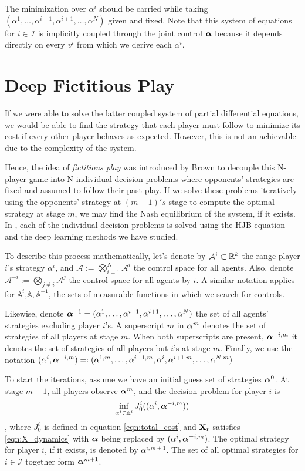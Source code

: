 The minimization over $\alpha^i$ should be carried while taking $(\alpha^1,\ldots,\alpha^{i-1},\alpha^{i+1},\ldots,\alpha^N)$ given and fixed. Note that this system of equations for $i\in\mathcal{I}$ is implicitly coupled through the joint control $\bm{\alpha}$ because it depends directly on every $v^i$ from which we derive each $\alpha^i$.

\section{Deep Fictitious Play}
If we were able to solve the latter coupled system of partial differential equations, we would be able to find the strategy that each player must follow to minimize its cost if every other player behaves as expected.  However, this is not an achievable due to the complexity of the system.

Hence, the idea of \textit{fictitious play} was introduced by Brown \cite{brown_notes_1949} to decouple this N-player game into N individual decision problems where opponents' strategies are fixed and assumed to follow their past play. If we solve these problems iteratively using the opponents' strategy  at $(m-1)'s$ stage to compute the optimal strategy at stage $m$, we may find the Nash equilibrium of the system, if it exists. In \cite{han_deep_2020}, each of the individual decision problems is solved using the HJB equation and the deep learning methods we have studied.  

To describe this process mathematically, let's denote by $\mathcal{A}^i\subset \mathbb{R}^k $ the range player $i$'s strategy $\alpha^i$, and $\mathcal{A}:=\bigotimes_{i=1}^{N}\mathcal{A}^i$ the control space for all agents. Also, denote $\mathcal{A}^{-i}:=\bigotimes_{j\neq i}\mathcal{A}^j$ the control space for all agents by $i$. A similar notation applies for $\mathbb{A}^i$,$\mathbb{A},\mathbb{A}^{-1}$, the sets of measurable functions in which we search for controls.

Likewise, denote $\bm{\alpha}^{-1}=(\alpha^1,\ldots,\alpha^{i-1},\alpha^{i+1},\ldots,\alpha^{N})$ the set of all agents' strategies excluding player $i$'s. A superscript $m$ in $\bm{\alpha}^m$ denotes the set of strategies of all players at stage $m$. When both superscripts are present, $\bm{\alpha}^{-i,m}$ it denotes the set of strategies of all players but $i$'s at stage $m$. Finally, we use the notation $(\alpha^i,\bm{\alpha}^{-i,m})=:(\alpha^{1,m},\ldots,\alpha^{i-1,m},\alpha^i,\alpha^{i+1,m},\ldots,\alpha^{N,m})$

To start the iterations, assume we have an initial guess set of strategies $\bm{\alpha}^0$. At stage $m+1$, all players observe $\bm{\alpha}^m$, and the decision problem for player $i$ is 
\begin{equation}
	\inf_{\alpha^i \in \mathbb{A}^i} J_0^i((\alpha^i,\bm{\alpha}^{-i,m}))
\end{equation},
where $J_0^i$ is defined in  equation \eqref{eqn:total_cost} and $\mathbf{X}_t$ satisfies \eqref{eqn:X_dynamics} with $\bm{\alpha}$ being replaced by $(\alpha^i,\bm{\alpha}^{-i,m})$. The optimal strategy for player $i$, if it exists, is denoted by $\alpha^{i,m+1}$. The set of all optimal strategies for $i\in\mathcal{I}$ together form $\bm{\alpha}^{m+1}$.

